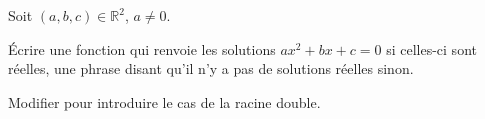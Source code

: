 \exer{}
\setcounter{numques}{0}

Soit $(a,b,c) \in \mathbb{R}^2$, $a\not=0$. 

Écrire une fonction  qui renvoie les solutions $ax^2+bx+c=0$ si celles-ci sont réelles, 
une phrase disant qu'il n'y a pas de solutions réelles sinon. 

Modifier pour introduire le cas de la racine double.
